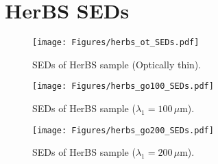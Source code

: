 \chapter{HerBS SEDs}

\begin{figure}
	\centering
	\texttt{[image: Figures/herbs\_ot\_SEDs.pdf]}
	\caption[SEDs of HerBS sample (Optically thin)]{SEDs of HerBS sample (Optically thin).}
\end{figure}

\begin{figure}
	\centering
	\texttt{[image: Figures/herbs\_go100\_SEDs.pdf]}
	\caption[SEDs of HerBS sample ($\lambda_1 = 100\,\mu$m)]{SEDs of HerBS sample ($\lambda_1 = 100\,\mu$m).}
\end{figure}

\begin{figure}
	\centering
	\texttt{[image: Figures/herbs\_go200\_SEDs.pdf]}
	\caption[SEDs of HerBS sample ($\lambda_1 = 200\,\mu$m)]{SEDs of HerBS sample ($\lambda_1 = 200\,\mu$m).}
\end{figure}